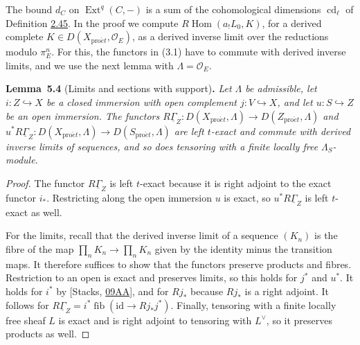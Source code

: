 \documentclass[11pt]{article}
\newenvironment{bpstatement}[2]{\par\addvspace{0.6\baselineskip}\noindent\textbf{#1}#2\textbf{.}\enspace\ignorespaces}
  {\par\addvspace{0.4\baselineskip}}
\newenvironment{bpstatementit}[2]{\begin{bpstatement}{#1}{#2}\itshape\ignorespaces}{\end{bpstatement}}
\providecommand{\Ext}{}\renewcommand{\Ext}{\operatorname{Ext}}
\providecommand{\fib}{}\renewcommand{\fib}{\operatorname{fib}}
\begin{document}
The bound \(d_C\) on \(\Ext^q(C,-)\) is a sum of the cohomological dimensions \(\operatorname{cd}_\ell\) of Definition \hyperref[bp137]{2.45}. In the proof we compute \(R\!\operatorname{Hom}(a_!L_0,K)\), for a derived complete \(K\in D(X_{\mathrm{pro}\acute{e}t},\mathcal O_E)\), as a derived inverse limit over the reductions modulo \(\pi_E^n\). For this, the functors in (3.1) have to commute with derived inverse limits, and we use the next lemma with \(\Lambda=\mathcal O_E\).

\label{bp421}%
\begin{bpstatementit}{Lemma~5.4}{ (Limits and sections with support)}
Let \(\Lambda\) be admissible, let \(i:Z\hookrightarrow X\) be a closed immersion with open complement \(j:V\hookrightarrow X\), and let \(u:S\hookrightarrow Z\) be an open immersion. The functors \(R\underline\Gamma_Z:D(X_{\mathrm{pro}\acute{e}t},\Lambda)\to D(Z_{\mathrm{pro}\acute{e}t},\Lambda)\) and \(u^*R\underline\Gamma_Z:D(X_{\mathrm{pro}\acute{e}t},\Lambda)\to D(S_{\mathrm{pro}\acute{e}t},\Lambda)\) are left \(t\)-exact and commute with derived inverse limits of sequences, and so does tensoring with a finite locally free \(\Lambda_S\)-module.
\end{bpstatementit}

\begin{proof}[{Proof}]\label{bp422}%
The functor \(R\underline\Gamma_Z\) is left \(t\)-exact because it is right adjoint to the exact functor \(i_*\). Restricting along the open immersion \(u\) is exact, so \(u^*R\underline\Gamma_Z\) is left \(t\)-exact as well.

For the limits, recall that the derived inverse limit of a sequence \((K_n)\) is the fibre of the map \(\prod_nK_n\to\prod_nK_n\) given by the identity minus the transition maps. It therefore suffices to show that the functors preserve products and fibres. Restriction to an open is exact and preserves limits, so this holds for \(j^*\) and \(u^*\). It holds for \(i^*\) by [Stacks, \href{https://stacks.math.columbia.edu/tag/09AA}{09AA}], and for \(Rj_*\) because \(Rj_*\) is a right adjoint. It follows for \(R\underline\Gamma_Z=i^*\fib(\mathrm{id}\to Rj_*j^*)\). Finally, tensoring with a finite locally free sheaf \(L\) is exact and is right adjoint to tensoring with \(L^\vee\), so it preserves products as well.
\end{proof}
\end{document}
